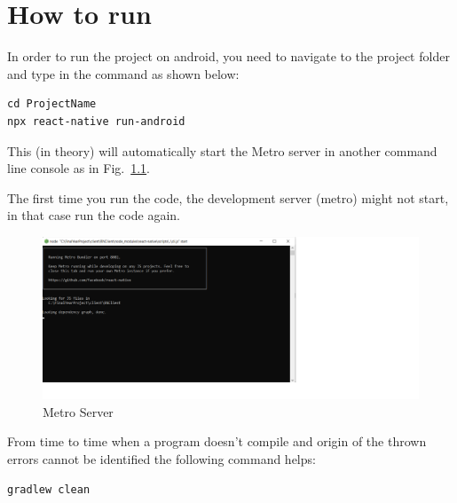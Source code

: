 \chapter{How to run}
 In order to run the project on android, you need to navigate to the project folder and type in the command as shown below:
 
\begin{lstlisting}
cd ProjectName
npx react-native run-android
\end{lstlisting}

This (in theory) will automatically start the Metro server in another command line console as in Fig.~\ref{fig:Metro}. 

The first time you run the code, the development server (metro) might not start, in that case run the code again.

\begin{figure}[ht]
    \centering
    \includegraphics[width=1.9\textwidth]{img/metro.png}
     \caption{Metro Server}
    \label{fig:Metro}
\end{figure}

From time to time when a program doesn't compile and origin of the thrown errors cannot be identified the following command helps: 

\begin{lstlisting}
gradlew clean
\end{lstlisting}

